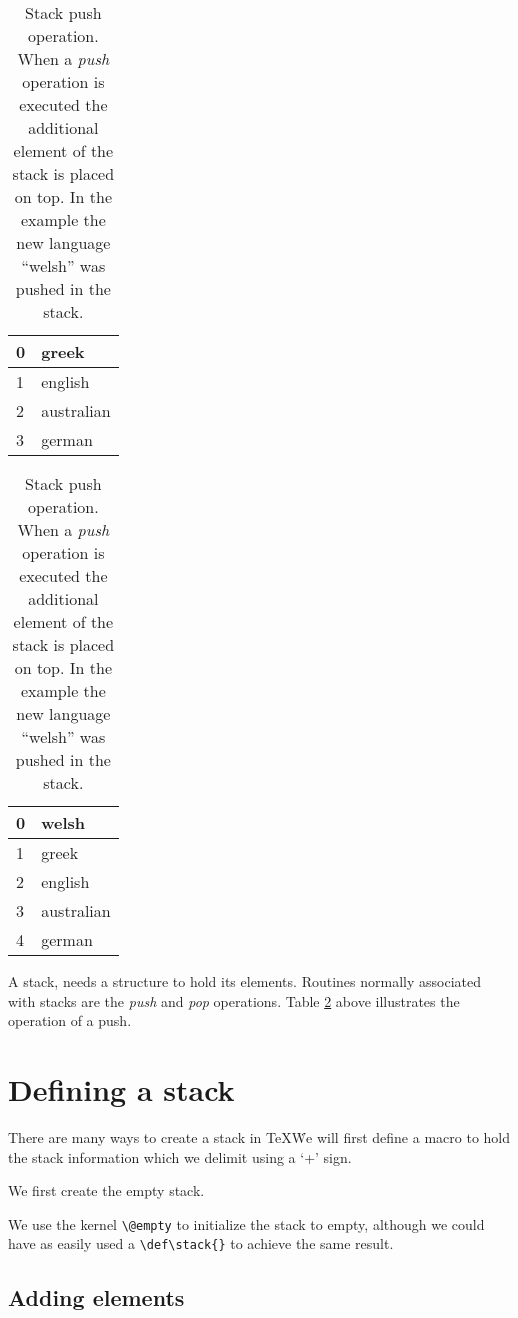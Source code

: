 \begin{table}[htbp]
\begin{center}
\begin{tabular}[t]{|l|l|}
\hline
0&greek\\\hline
1&english\\\hline
2&australian\\\hline
3&german\\
\hline
\end{tabular}
\begin{tabular}[t]{|l|l|}
\hline
0&welsh\\\hline
1&greek\\\hline
2&english\\\hline
3&australian\\\hline
4&german\\
\hline
\end{tabular}
\caption{\small Stack push operation. When a \textit{push} operation is executed the additional element of the stack is placed on top. In the example the new language ``welsh'' was pushed in the stack.}
\label{tbl:stack}
\end{center}
\end{table}

A stack, needs a structure to hold its elements. Routines normally associated with stacks are the \textit{push} and \textit{pop} operations.
Table \ref{tbl:stack} above illustrates the operation of a push.
\section{Defining a stack}
  
There are many ways to create a stack in \TeX\. We will first define a macro to hold the stack information which we delimit using a `+' sign.

We first create the empty stack.

\emphasis{\let}
\begin{teXXX}
\let\stack\@empty
\end{teXXX}
\let\stack\@empty

We use the kernel \verb+\@empty+ to initialize the stack to empty, although we could have as easily used a \verb+\def\stack{}+ to achieve the same result.

\subsection{Adding elements}

